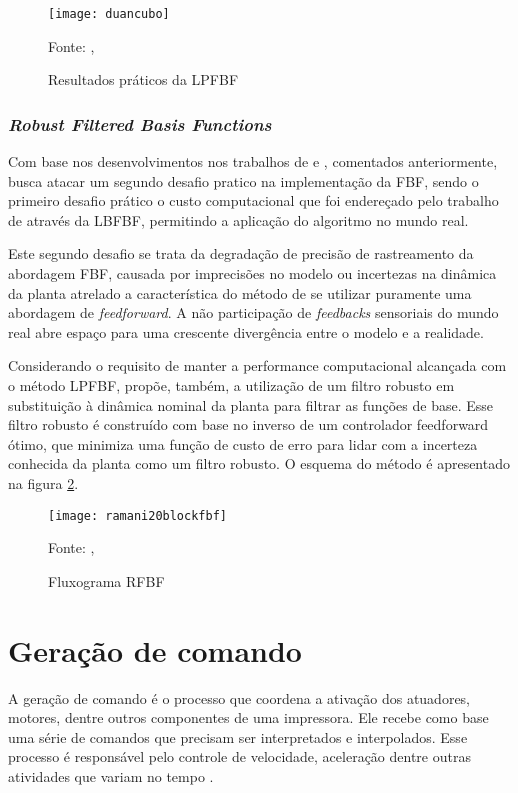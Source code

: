 \begin{figure}[!htb]
    \centering
    \caption{Resultados práticos da LPFBF}
    \texttt{[image: duancubo]}

    {\footnotesize Fonte: \citeauthor{duan18}, \citeyear{duan18}}
    \label{fig:duancubo}
\end{figure}

\subsubsection{\textit{Robust Filtered Basis Functions}}

Com base nos desenvolvimentos nos trabalhos de \cite{ramani17} e \cite{duan18}, comentados anteriormente, 
\cite{ramani20} busca atacar um segundo desafio pratico na implementação da FBF, sendo o primeiro desafio prático
o custo computacional que foi endereçado pelo trabalho de \cite{duan18} através da LBFBF, permitindo a aplicação
do algoritmo no mundo real.

Este segundo desafio se trata da degradação de precisão de rastreamento da abordagem FBF, causada por
imprecisões no modelo ou incertezas na dinâmica da planta atrelado a característica do método de se
utilizar puramente uma abordagem de \textit{feedforward}. A não participação de \textit{feedbacks} sensoriais
do mundo real abre espaço para uma crescente divergência entre o modelo e a realidade.

Considerando o requisito de manter a performance computacional alcançada com o método LPFBF, \cite{ramani20} 
propõe, também, a utilização de um filtro robusto em substituição à dinâmica nominal da planta para 
filtrar as funções de base. Esse filtro robusto é construído com base no inverso de um controlador 
feedforward ótimo, que minimiza uma função de custo de erro para lidar com a incerteza conhecida da planta 
como um filtro robusto.
O esquema do método é apresentado na figura \ref*{fig:flowchart_rfbf}.

\begin{figure}[!htb]
    \centering
    \caption{Fluxograma RFBF}
    \texttt{[image: ramani20blockfbf]}

    {\footnotesize Fonte: \citeauthor{ramani20}, \citeyear{ramani20}}
    \label{fig:flowchart_rfbf}
\end{figure}

\section{Geração de comando}
A geração de comando é o processo que coordena a ativação dos 
atuadores, motores, dentre outros componentes de uma impressora. 
Ele recebe como base uma série de comandos que precisam ser 
interpretados e interpolados. Esse processo é responsável pelo 
controle de velocidade, aceleração dentre outras atividades que 
variam no tempo \cite{yu20}. 

